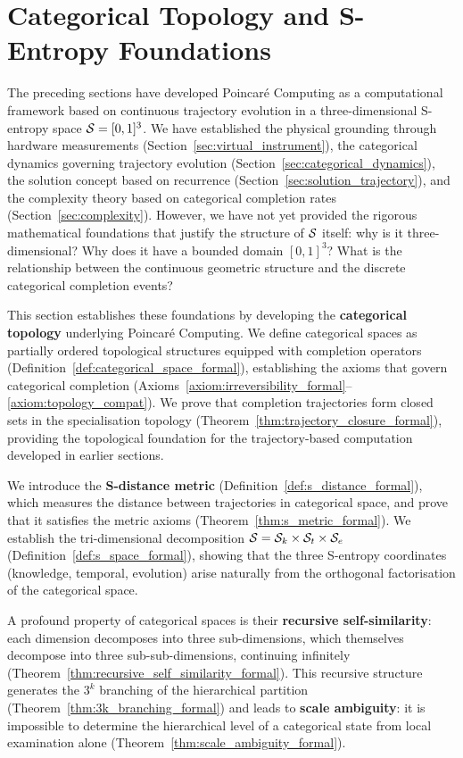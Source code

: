 \section{Categorical Topology and S-Entropy Foundations}
\label{sec:topology}

The preceding sections have developed Poincaré Computing as a computational framework based on continuous trajectory evolution in a three-dimensional S-entropy space $\mathcal{S} = [0,1]^3$. We have established the physical grounding through hardware measurements (Section~\ref{sec:virtual_instrument}), the categorical dynamics governing trajectory evolution (Section~\ref{sec:categorical_dynamics}), the solution concept based on recurrence (Section~\ref{sec:solution_trajectory}), and the complexity theory based on categorical completion rates (Section~\ref{sec:complexity}). However, we have not yet provided the rigorous mathematical foundations that justify the structure of $\mathcal{S}$ itself: why is it three-dimensional? Why does it have a bounded domain $[0,1]^3$? What is the relationship between the continuous geometric structure and the discrete categorical completion events?

This section establishes these foundations by developing the \textbf{categorical topology} underlying Poincaré Computing. We define categorical spaces as partially ordered topological structures equipped with completion operators (Definition~\ref{def:categorical_space_formal}), establishing the axioms that govern categorical completion (Axioms~\ref{axiom:irreversibility_formal}--\ref{axiom:topology_compat}). We prove that completion trajectories form closed sets in the specialisation topology (Theorem~\ref{thm:trajectory_closure_formal}), providing the topological foundation for the trajectory-based computation developed in earlier sections.

We introduce the \textbf{S-distance metric} (Definition~\ref{def:s_distance_formal}), which measures the distance between trajectories in categorical space, and prove that it satisfies the metric axioms (Theorem~\ref{thm:s_metric_formal}). We establish the tri-dimensional decomposition $\mathcal{S} = \mathcal{S}_k \times \mathcal{S}_t \times \mathcal{S}_e$ (Definition~\ref{def:s_space_formal}), showing that the three S-entropy coordinates (knowledge, temporal, evolution) arise naturally from the orthogonal factorisation of the categorical space.

A profound property of categorical spaces is their \textbf{recursive self-similarity}: each dimension decomposes into three sub-dimensions, which themselves decompose into three sub-sub-dimensions, continuing infinitely (Theorem~\ref{thm:recursive_self_similarity_formal}). This recursive structure generates the $3^k$ branching of the hierarchical partition (Theorem~\ref{thm:3k_branching_formal}) and leads to \textbf{scale ambiguity}: it is impossible to determine the hierarchical level of a categorical state from local examination alone (Theorem~\ref{thm:scale_ambiguity_formal}).

